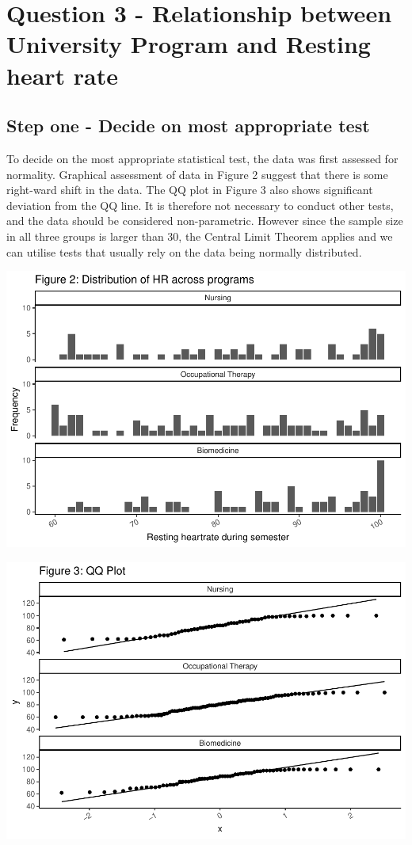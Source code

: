 \documentclass[preprint, 3p,
authoryear]{elsarticle} %
\begin{document}
\hypertarget{question-3---relationship-between-university-program-and-resting-heart-rate}{%
\section{Question 3 - Relationship between University Program and
Resting heart
rate}\label{question-3---relationship-between-university-program-and-resting-heart-rate}}

\hypertarget{step-one---decide-on-most-appropriate-test}{%
\subsection{Step one - Decide on most appropriate
test}\label{step-one---decide-on-most-appropriate-test}}

To decide on the most appropriate statistical test, the data was first
assessed for normality. Graphical assessment of data in Figure 2 suggest
that there is some right-ward shift in the data. The QQ plot in Figure 3
also shows significant deviation from the QQ line. It is therefore not
necessary to conduct other tests, and the data should be considered
non-parametric. However since the sample size in all three groups is
larger than 30, the Central Limit Theorem applies and we can utilise
tests that usually rely on the data being normally distributed.

\includegraphics{assignment_2_files/figure-latex/distribution of results`-1.pdf}

\includegraphics{assignment_2_files/figure-latex/qq plot-1.pdf}
\end{document}
